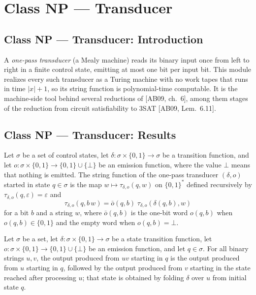 \section{Class NP --- Transducer}
\subsection*{Class NP --- Transducer: Introduction}

A \emph{one-pass transducer} (a Mealy machine) reads its binary input once from left to
right in a finite control state, emitting at most one bit per input bit. This module
realizes every such transducer as a Turing machine with no work tapes that runs in time
$|x| + 1$, so its string function is polynomial-time computable. It is the machine-side
tool behind several reductions of [AB09, ch.~6], among them stages of the reduction from
circuit satisfiability to 3SAT [AB09, Lem.~6.11].

\subsection*{Class NP --- Transducer: Results}

\begin{definition}
\label{Complexity.transduce}
\leanok
Let $\sigma$ be a set of control states, let $\delta : \sigma \times \{0,1\} \to \sigma$ be a
transition function, and let $o : \sigma \times \{0,1\} \to \{0,1\} \cup \{\bot\}$ be an
emission function, where the value $\bot$ means that nothing is emitted. The string
function of the one-pass transducer $(\delta, o)$ started in state $q \in \sigma$ is the map
$w \mapsto \tau_{\delta,o}(q, w)$ on $\{0,1\}^*$ defined recursively by
$\tau_{\delta,o}(q, \varepsilon) = \varepsilon$ and
\[ \tau_{\delta,o}(q, b\,w) = \bar o(q,b)\;\tau_{\delta,o}(\delta(q,b), w) \]
for a bit $b$ and a string $w$, where $\bar o(q,b)$ is the one-bit word $o(q,b)$ when
$o(q,b) \in \{0,1\}$ and the empty word when $o(q,b) = \bot$.
\end{definition}

\begin{theorem}
\label{Complexity.transduce_append}
\leanok
{}
Let $\sigma$ be a set, let $\delta:\sigma\times\{0,1\}\to\sigma$ be a state transition
function, let $o:\sigma\times\{0,1\}\to\{0,1\}\cup\{\bot\}$ be an emission function, and
let $q\in\sigma$. For all binary strings $u,v$, the output produced from $uv$ starting
in $q$ is the output produced from $u$ starting in $q$, followed by the output produced
from $v$ starting in the state reached after processing $u$; that state is obtained by
folding $\delta$ over $u$ from initial state $q$.
\end{theorem}

